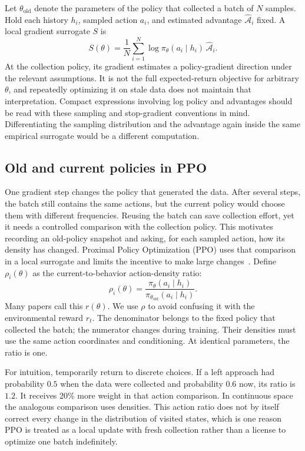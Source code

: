Let $\theta_{\mathrm{old}}$ denote the parameters of the policy that collected a batch of $N$ samples. Hold each history $h_i$, sampled action $a_i$, and estimated advantage $\widehat{\mathcal A}_i$ fixed. A local gradient surrogate $S$ is
\begin{equation}
 S(\theta)=\frac1N\sum_{i=1}^N
 \log\pi_\theta(a_i\mid h_i)\,\widehat{\mathcal A}_i.
 \label{eq:local}
\end{equation}
At the collection policy, its gradient estimates a policy-gradient direction under the relevant assumptions. It is not the full expected-return objective for arbitrary $\theta$, and repeatedly optimizing it on stale data does not maintain that interpretation. Compact expressions involving log policy and advantages should be read with these sampling and stop-gradient conventions in mind. Differentiating the sampling distribution and the advantage again inside the same empirical surrogate would be a different computation.

\subsection{Old and current policies in PPO}

One gradient step changes the policy that generated the data. After several steps, the batch still contains the same actions, but the current policy would choose them with different frequencies. Reusing the batch can save collection effort, yet it needs a controlled comparison with the collection policy. This motivates recording an old-policy snapshot and asking, for each sampled action, how its density has changed. Proximal Policy Optimization (PPO) uses that comparison in a local surrogate and limits the incentive to make large changes~\citep{ppoguide}.
Define $\rho_i(\theta)$ as the current-to-behavior action-density ratio:
\begin{equation}
 \rho_i(\theta)=
 \frac{\pi_\theta(a_i\mid h_i)}{\pi_{\theta_{\mathrm{old}}}(a_i\mid h_i)}.
 \label{eq:ppo-ratio}
\end{equation}
Many papers call this $r(\theta)$. We use $\rho$ to avoid confusing it with the environmental reward $r_t$. The denominator belongs to the fixed policy that collected the batch; the numerator changes during training. Their densities must use the same action coordinates and conditioning. At identical parameters, the ratio is one.

For intuition, temporarily return to discrete choices. If a left approach had probability $0.5$ when the data were collected and probability $0.6$ now, its ratio is $1.2$. It receives 20\% more weight in that action comparison. In continuous space the analogous comparison uses densities. This action ratio does not by itself correct every change in the distribution of visited states, which is one reason PPO is treated as a local update with fresh collection rather than a license to optimize one batch indefinitely.

